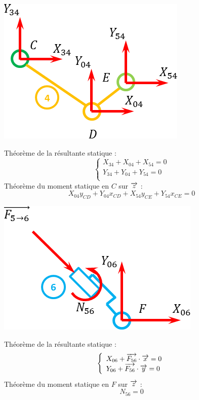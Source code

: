 \documentclass[10pt]{article}
\begin{document}
\begin{exemple}
\begin{minipage}[c]{.35\linewidth}
\begin{center}
\includegraphics[width=.9\textwidth]{images/4}
\end{center}
\end{minipage}\hfill
\begin{minipage}[c]{.6\linewidth}
Théorème de la résultante statique : 
$$
\left\{
\begin{array}{l}
X_{34}+X_{04}+X_{54}=0 \\
Y_{34}+Y_{04}+Y_{54}=0 \\
\end{array}
\right.
$$
Théorème du moment statique en $C$ sur $\overrightarrow{z}$ : 
$$
X_{04}y_{CD}+Y_{04}x_{CD}+X_{54}y_{CE}+Y_{54}x_{CE}=0
$$
\end{minipage}

\begin{minipage}[c]{.35\linewidth}
\begin{center}
\includegraphics[width=.9\textwidth]{images/6}
\end{center}
\end{minipage}\hfill
\begin{minipage}[c]{.6\linewidth}
Théorème de la résultante statique : 
$$
\left\{
\begin{array}{l}
X_{06}+\overrightarrow{F_{56}}\cdot\overrightarrow{x}=0\\
Y_{06}+\overrightarrow{F_{56}}\cdot\overrightarrow{y}=0\\
\end{array}
\right.
$$
Théorème du moment statique en $F$ sur $\overrightarrow{z}$ : 
$$
N_{56}=0
$$
\end{minipage}


\end{exemple}
\end{document}
